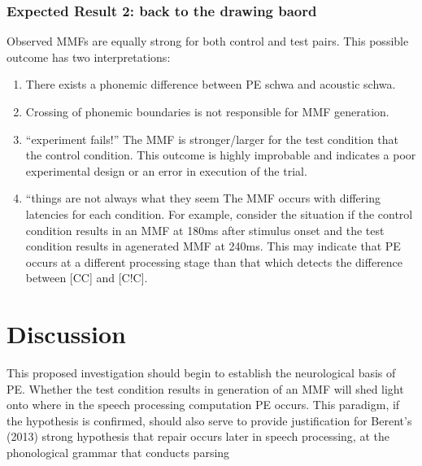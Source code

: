 \documentclass[jou,apacite]{apa6}
\begin{document}
        \subsubsection{Expected Result 2: back to the drawing baord}
        Observed MMFs are equally strong for both control and test pairs. This possible outcome has two interpretations:
        
            \begin{enumerate}
                \item There exists a phonemic difference between PE schwa and acoustic schwa.
                \item Crossing of phonemic boundaries is not responsible for MMF generation.
                \item “experiment fails!” The MMF is stronger/larger for the test condition that the control condition. This outcome is highly improbable and indicates a poor experimental design or an error in execution of the trial.
                \item “things are not always what they seem The MMF occurs with differing latencies for each condition. For example, consider the situation if the control condition results in an MMF at 180ms after stimulus onset and the test condition results in agenerated MMF at 240ms. This may indicate that PE occurs at a different processing stage than that which detects the difference between [CC] and [C!C].
            \end{enumerate}

\section{Discussion}

This proposed investigation should begin to establish the neurological basis of PE. Whether the test condition results in generation of an MMF will shed light onto where in the speech processing computation PE occurs. This paradigm, if the hypothesis is confirmed, should also serve to provide justification for Berent’s (2013) strong hypothesis that repair occurs later in speech processing, at the phonological grammar that conducts parsing
   






\end{document}
